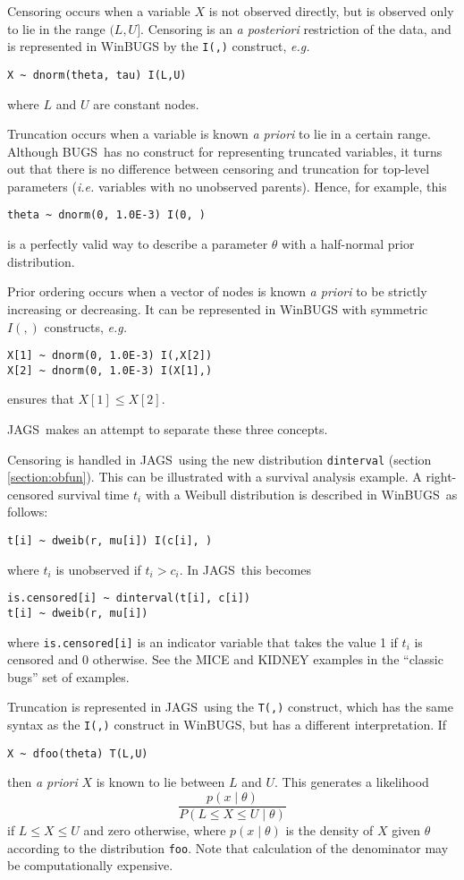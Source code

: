 \documentclass[11pt, a4paper, titlepage]{report}
\newcommand{\JAGS}{\textsf{JAGS}}
\newcommand{\BUGS}{\textsf{BUGS}}
\newcommand{\WinBUGS}{\textsf{WinBUGS}}
\begin{document}
Censoring occurs when a variable $X$ is not observed directly,
but is observed only to lie in the range $(L,U]$.  Censoring is
an {\em a posteriori} restriction of the data, and is represented
in WinBUGS by the \texttt{I(,)} construct, {\em e.g.}
\begin{verbatim}
X ~ dnorm(theta, tau) I(L,U)
\end{verbatim}
where $L$ and $U$ are constant nodes.

Truncation occurs when a variable is known {\em a priori} to lie in
a certain range.  Although \BUGS\ has no construct for representing
truncated variables, it turns out that there is no difference between
censoring and truncation for top-level parameters ({\em i.e.} variables
with no unobserved parents).  Hence, for example, this
\begin{verbatim}
theta ~ dnorm(0, 1.0E-3) I(0, )
\end{verbatim}
is a perfectly valid way to describe a parameter $\theta$ with a
half-normal prior distribution.

Prior ordering occurs when a vector of nodes is known {\em a priori}
to be strictly increasing or decreasing. It can be represented in
WinBUGS with symmetric $I(,)$ constructs,  {\em e.g.}
\begin{verbatim}
X[1] ~ dnorm(0, 1.0E-3) I(,X[2])
X[2] ~ dnorm(0, 1.0E-3) I(X[1],)
\end{verbatim}
ensures that $X[1] \leq X[2]$.

\JAGS\ makes an attempt to separate these three concepts.

Censoring is handled in \JAGS\ using the new distribution
\texttt{dinterval} (section \ref{section:obfun}). This can be
illustrated with a survival analysis example.  A right-censored
survival time $t_i$ with a Weibull distribution is described in
\WinBUGS\ as follows:
\begin{verbatim}
t[i] ~ dweib(r, mu[i]) I(c[i], )
\end{verbatim}
where $t_i$ is unobserved if $t_i > c_i$.  In \JAGS\ this becomes
\begin{verbatim}
is.censored[i] ~ dinterval(t[i], c[i])
t[i] ~ dweib(r, mu[i])
\end{verbatim}
where \verb+is.censored[i]+ is an indicator variable that takes the
value 1 if $t_i$ is censored and 0 otherwise. See the MICE and KIDNEY
examples in the ``classic bugs'' set of examples.

Truncation is represented in \JAGS\ using the \texttt{T(,)} construct,
which has the same syntax as the \texttt{I(,)} construct in \WinBUGS,
but has a different interpretation. If
\begin{verbatim}
X ~ dfoo(theta) T(L,U)
\end{verbatim}
then {\em a priori} $X$ is known to lie between $L$ and $U$. This
generates a likelihood
\[
\frac{p(x \mid \theta)}{P(L \leq X \leq U \mid \theta)}
\]
if $L \leq X \leq U$ and zero otherwise, where $p(x \mid \theta)$ is
the density of $X$ given $\theta$ according to the distribution
\texttt{foo}. Note that calculation of the denominator may be
computationally expensive.
\end{document}
